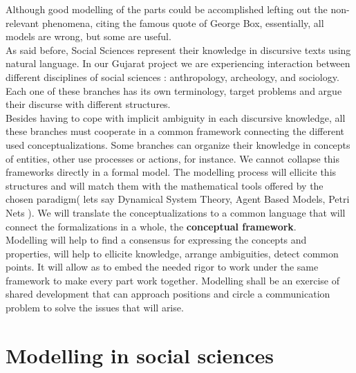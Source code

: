 \documentclass[11pt,oneside,a4paper,openright]{report}
\begin{document}
Although good modelling of the parts could be accomplished lefting out the non-relevant phenomena, citing the famous quote of George Box, essentially, all models are wrong, but some are useful.\\
As said before, Social Sciences represent their knowledge in discursive texts using natural language. In our Gujarat project we are experiencing interaction between different disciplines of social sciences : anthropology, archeology, and sociology. Each one of these branches has its own terminology, target problems and argue their discurse with different structures.\\ 
Besides having to cope with implicit ambiguity in each discursive knowledge, all these branches must cooperate in a common framework connecting the different used conceptualizations. Some branches can organize their knowledge in concepts of entities, other use processes or actions, for instance. We cannot collapse this frameworks directly in a formal model. The modelling process will ellicite this structures and will match them with the mathematical tools offered by the chosen paradigm( lets say Dynamical System Theory, Agent Based Models, Petri Nets ). We will translate the conceptualizations to a common language that will connect the formalizations in a whole, the \textbf{conceptual framework}.\\
Modelling will help to find a consensus for expressing the concepts and properties, will help to ellicite knowledge, arrange ambiguities, detect common points. It will allow as to embed the needed rigor to work under the same framework to make every part work together. Modelling shall be an exercise of shared development that can approach positions and circle a communication problem to solve the issues that will arise.\\





\section{Modelling in social sciences}
\label{sec:modelsinSC}
\end{document}
